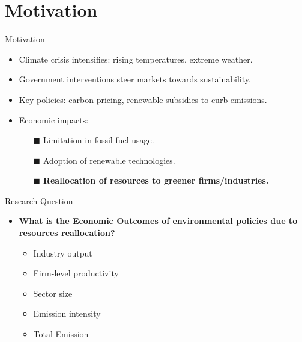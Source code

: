 \documentclass[aspectratio=169]{beamer}
\subtitle{}
\institute[SSE]{Stockholm School of Economics}
\begin{document}
\maketitle
\section{Motivation}
\begin{frame}{Motivation}\large 
	\begin{itemize}
        \item Climate crisis intensifies: rising temperatures, extreme weather.
        \pause
        \item Government interventions steer markets towards sustainability.
        \item Key policies: carbon pricing, renewable subsidies to curb emissions.
        \item Economic impacts:
            \begin{itemize}
                \item[$\blacksquare$] Limitation in fossil fuel usage.
                \item[$\blacksquare$] Adoption of renewable technologies.\pause
                \item[$\blacksquare$] {\bf Reallocation of resources to greener firms/industries.}
            \end{itemize}
	\end{itemize}
\end{frame}
\begin{frame}{Research Question}
	\begin{itemize}
		\item \textbf{What is the Economic Outcomes of environmental policies due to \underline{resources reallocation}?}
		\begin{itemize}
			\item Industry output
			\item Firm-level productivity
			\item Sector size
			\item Emission intensity
			\item Total Emission
		\end{itemize}
	\end{itemize}
\end{frame}
\end{document}
